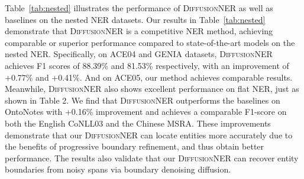\documentclass[11pt]{article}
\begin{document}
Table~\ref{tab:nested} illustrates the performance of \textsc{DiffusionNER} as well as baselines on the nested NER datasets. Our results in Table~\ref{tab:nested} demonstrate that \textsc{DiffusionNER} is a competitive NER method, achieving comparable or superior performance compared to state-of-the-art models on the nested NER. Specifically, on ACE04 and GENIA datasets, \textsc{DiffusionNER} achieves F1 scores of 88.39\% and 81.53\% respectively, with an improvement of +0.77\% and +0.41\%. And on ACE05, our method achieves comparable results. Meanwhile, \textsc{DiffusionNER} also shows excellent performance on flat NER, just as shown in Table 2.  We find that \textsc{DiffusionNER} outperforms the baselines on OntoNotes with +0.16\% improvement and achieves a comparable F1-score on both the English CoNLL03 and the Chinese MSRA. These improvements demonstrate that our \textsc{DiffusionNER} can locate entities more accurately due to the benefits of progressive boundary refinement, and thus obtain better performance. The results also validate that our \textsc{DiffusionNER} can recover entity boundaries from noisy spans via boundary denoising diffusion.
\end{document}
